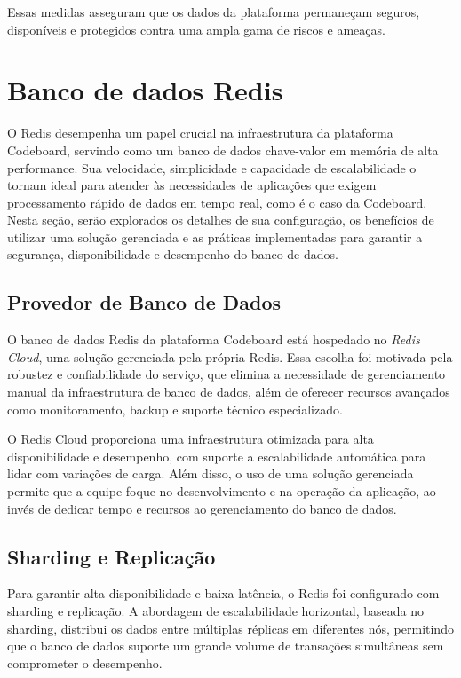 Essas medidas asseguram que os dados da plataforma permaneçam seguros, disponíveis e protegidos contra uma ampla gama de riscos e ameaças.

\section{Banco de dados Redis}

O Redis desempenha um papel crucial na infraestrutura da plataforma Codeboard, servindo como um banco de dados chave-valor em memória de alta performance. Sua velocidade, simplicidade e capacidade de escalabilidade o tornam ideal para atender às necessidades de aplicações que exigem processamento rápido de dados em tempo real, como é o caso da Codeboard. Nesta seção, serão explorados os detalhes de sua configuração, os benefícios de utilizar uma solução gerenciada e as práticas implementadas para garantir a segurança, disponibilidade e desempenho do banco de dados.

\subsection{Provedor de Banco de Dados}

O banco de dados Redis da plataforma Codeboard está hospedado no \emph{Redis Cloud}, uma solução gerenciada pela própria Redis. Essa escolha foi motivada pela robustez e confiabilidade do serviço, que elimina a necessidade de gerenciamento manual da infraestrutura de banco de dados, além de oferecer recursos avançados como monitoramento, backup e suporte técnico especializado.

O Redis Cloud proporciona uma infraestrutura otimizada para alta disponibilidade e desempenho, com suporte a escalabilidade automática para lidar com variações de carga. Além disso, o uso de uma solução gerenciada permite que a equipe foque no desenvolvimento e na operação da aplicação, ao invés de dedicar tempo e recursos ao gerenciamento do banco de dados.

\subsection{Sharding e Replicação}

Para garantir alta disponibilidade e baixa latência, o Redis foi configurado com sharding e replicação. A abordagem de escalabilidade horizontal, baseada no sharding, distribui os dados entre múltiplas réplicas em diferentes nós, permitindo que o banco de dados suporte um grande volume de transações simultâneas sem comprometer o desempenho.

